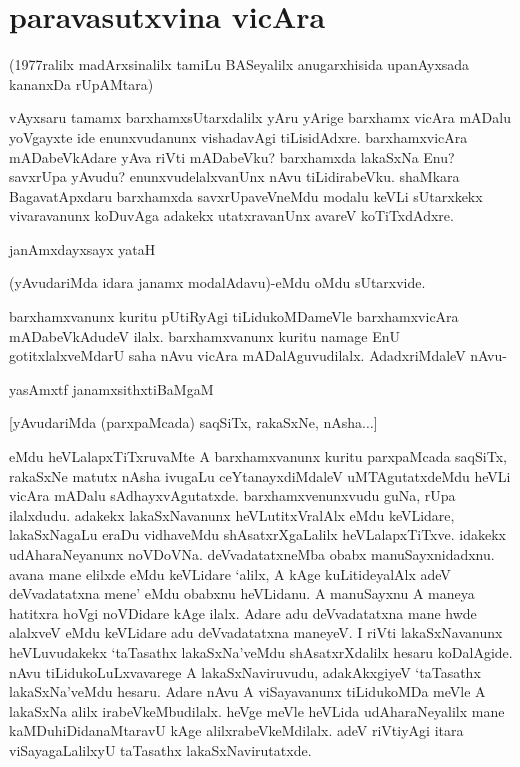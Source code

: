 \chapter{paravasutxvina vicAra}\label{chap13}

(1977ralilx madArxsinalilx tamiLu BASeyalilx anugarxhisida upanAyxsada kananxDa rUpAMtara)

vAyxsaru tamamx barxhamxsUtarxdalilx yAru yArige barxhamx vicAra mADalu yoVgayxte ide enunxvudanunx vishadavAgi tiLisidAdxre. barxhamxvicAra mADabeVkAdare yAva riVti mADabeVku? barxhamxda lakaSxNa Enu? savxrUpa yAvudu? enunxvudelalxvanUnx nAvu tiLidirabeVku. shaMkara BagavatApxdaru barxhamxda savxrUpaveVneMdu modalu keVLi sUtarxkekx vivaravanunx koDuvAga adakekx utatxravanUnx avareV koTiTxdAdxre. 

janAmxdayxsayx yataH

(yAvudariMda idara janamx modalAdavu)-eMdu oMdu sUtarxvide. 

barxhamxvanunx kuritu pUtiRyAgi tiLidukoMDameVle barxhamxvicAra mADabeVkAdudeV ilalx. barxhamxvanunx kuritu namage EnU gotitxlalxveMdarU saha nAvu vicAra mADalAguvudilalx. AdadxriMdaleV nAvu- 

\begin{shloka}
yasAmxtf janamxsithxtiBaMgaM
\end{shloka}

[yAvudariMda (parxpaMcada) saqSiTx, rakaSxNe, nAsha$\ldots$]

eMdu heVLalapxTiTxruvaMte A barxhamxvanunx kuritu parxpaMcada saqSiTx, rakaSxNe matutx nAsha ivugaLu ceYtanayxdiMdaleV uMTAgutatxdeMdu heVLi vicAra mADalu sAdhayxvAgutatxde. barxhamxvenunxvudu guNa, rUpa ilalxdudu. adakekx lakaSxNavanunx heVLutitxVralAlx eMdu keVLidare, lakaSxNagaLu eraDu vidhaveMdu shAsatxrXgaLalilx heVLalapxTiTxve. idakekx udAharaNeyanunx noVDoVNa. deVvadatatxneMba obabx manuSayxnidadxnu. avana mane elilxde eMdu keVLidare `alilx, A kAge kuLitideyalAlx adeV deVvadatatxna mene' eMdu obabxnu heVLidanu. A manuSayxnu A maneya hatitxra hoVgi noVDidare kAge ilalx. Adare adu deVvadatatxna mane hwde alalxveV eMdu keVLidare adu deVvadatatxna maneyeV. I riVti lakaSxNavanunx heVLuvudakekx `taTasathx lakaSxNa'veMdu shAsatxrXdalilx hesaru koDalAgide. nAvu tiLidukoLuLxvavarege A lakaSxNaviruvudu, adakAkxgiyeV `taTasathx lakaSxNa'veMdu hesaru. Adare nAvu A viSayavanunx tiLidukoMDa meVle A lakaSxNa alilx irabeVkeMbudilalx. heVge meVle heVLida udAharaNeyalilx mane kaMDuhiDidanaMtaravU kAge alilxrabeVkeMdilalx. adeV riVtiyAgi itara viSayagaLalilxyU taTasathx lakaSxNavirutatxde. 


